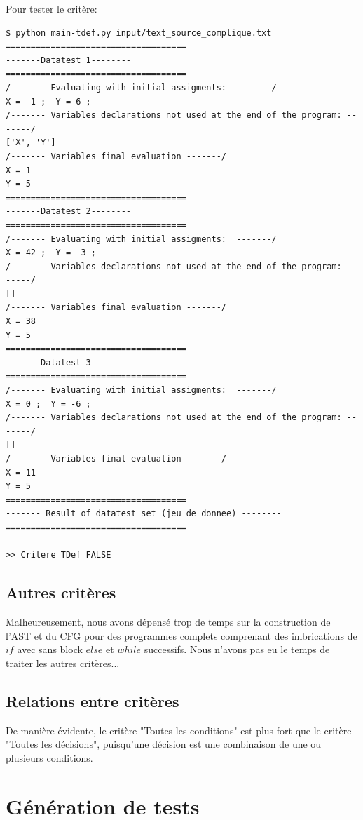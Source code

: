 \documentclass[a4paper]{article}
\begin{document}
Pour tester le critère:
\begin{verbatim}
$ python main-tdef.py input/text_source_complique.txt ====================================
-------Datatest 1--------
====================================
/------- Evaluating with initial assigments:  -------/
X = -1 ;  Y = 6 ;
/------- Variables declarations not used at the end of the program: -------/
['X', 'Y']
/------- Variables final evaluation -------/
X = 1
Y = 5
====================================
-------Datatest 2--------
====================================
/------- Evaluating with initial assigments:  -------/
X = 42 ;  Y = -3 ;
/------- Variables declarations not used at the end of the program: -------/
[]
/------- Variables final evaluation -------/
X = 38
Y = 5
====================================
-------Datatest 3--------
====================================
/------- Evaluating with initial assigments:  -------/
X = 0 ;  Y = -6 ;
/------- Variables declarations not used at the end of the program: -------/
[]
/------- Variables final evaluation -------/
X = 11
Y = 5
====================================
------- Result of datatest set (jeu de donnee) --------
====================================

>> Critere TDef FALSE

\end{verbatim}

\subsection{Autres critères}

Malheureusement, nous avons dépensé trop de temps sur la construction de l'AST et du CFG pour des programmes complets comprenant des imbrications de $if$ avec sans block $else$ et $while$ successifs. Nous n'avons pas eu le temps de traiter les autres critères... 

\subsection{Relations entre critères}

De manière évidente, le critère "Toutes les conditions" est plus fort que le critère "Toutes les décisions", puisqu'une décision est une combinaison de une ou plusieurs conditions. 

\section{Génération de tests}
\end{document}
